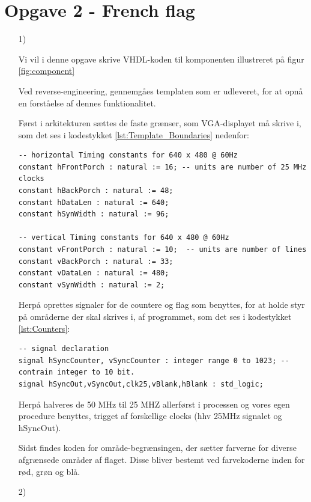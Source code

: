 \section{Opgave 2 - French flag}

\begin{enumerate}
\item[1)]

	
Vi vil i denne opgave skrive VHDL-koden til komponenten illustreret på figur \ref{fig:component}


Ved reverse-engineering, gennemgåes templaten som er udleveret, for at opnå en forståelse af dennes funktionalitet.
	
Først i arkitekturen sættes de faste grænser, som VGA-displayet må skrive i, som det ses i kodestykket \ref{lst:Template_Boundaries} nedenfor:
	\begin{lstlisting}[caption={Template Boundaries},label={lst:Template_Boundaries}]
-- horizontal Timing constants for 640 x 480 @ 60Hz
constant hFrontPorch : natural := 16; -- units are number of 25 MHz clocks
constant hBackPorch : natural := 48; 
constant hDataLen : natural := 640;
constant hSynWidth : natural := 96;

-- vertical Timing constants for 640 x 480 @ 60Hz 
constant vFrontPorch : natural := 10;  -- units are number of lines
constant vBackPorch : natural := 33;
constant vDataLen : natural := 480;
constant vSynWidth : natural := 2;

	\end{lstlisting}
	
Herpå oprettes signaler for de countere og flag som benyttes, for at holde styr på områderne der skal skrives i, af programmet, som det ses i kodestykket \ref{lst:Counters}:
\begin{lstlisting}[caption={Signal declaration},label={lst:Counters}]
-- signal declaration
signal hSyncCounter, vSyncCounter : integer range 0 to 1023; -- contrain integer to 10 bit.
signal hSyncOut,vSyncOut,clk25,vBlank,hBlank : std_logic;
\end{lstlisting}
	
Herpå halveres de 50 MHz til 25 MHZ allerførst i processen og vores egen procedure benyttes, trigget af forskellige clocks (hhv 25MHz signalet og hSyncOut).

Sidst findes koden for område-begrænsingen, der sætter farverne for diverse afgrænsede områder af flaget. Disse bliver bestemt ved farvekoderne inden for rød, grøn og blå.

\newpage
\item[2)]


\end{enumerate}
